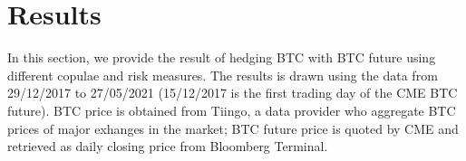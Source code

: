 \section{Results}\label{sec:results}
In this section, we provide the result of hedging BTC with BTC future using different copulae and risk measures.
The results is drawn using the data from 29/12/2017 to 27/05/2021 (15/12/2017 is the first trading day of the CME BTC future).
BTC price is obtained from Tiingo, a data provider who aggregate BTC prices of major exhanges in the market;
BTC future price is quoted by CME and retrieved as daily closing price from Bloomberg Terminal.
\medskip
